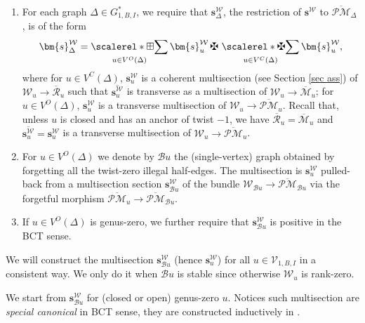 \documentclass[11pt]{amsart}
\theoremstyle{definition}
\theoremstyle{remark}
\newcommand{\Ass}{{{\,\maltese\,}}}
\newcommand{\oPMb}{{\overline{\mathcal{PM}}}}
\newcommand{\<}{\left<}
\renewcommand{\>}{\right>}
\numberwithin{equation}{section}
\def\Mbar{{\overline{\mathcal M}}}
\DeclareMathOperator*{\bboxplus}{\scalerel*{\boxplus}{\sum}}
\DeclareMathOperator*{\bass}{\scalerel*{\maltese}{\sum}}
\begin{document}
\begin{enumerate}
    \item For each graph $\Delta\in G_{1,B,I}^*$, we require that $\bm{s}^{\mathcal W}_{\Delta}$, the restriction of $\bm{s}^{\mathcal W}$ to $\oPMb_\Delta$, is of the form
    \begin{equation}\label{eq docomposition of section of witten on central}
        \bm{s}^{\mathcal W}_{\Delta}= \bboxplus_{u\in V^O(\Delta)} \bm{s}_u^{\mathcal W}\Ass\bass_{u\in V^C(\Delta)}\bm{s}_u^{\mathcal W},
    \end{equation}
    where for $u\in V^C(\Delta)$, $\bm{s}_u^{\mathcal W}$ is a coherent multisection (see Section \ref{sec ass}) of $\mathcal W_u\to \overline{\mathcal R}_u$ such that $\overline{\bm{s}_u^{\mathcal W}}$ is transverse as a multisection of $\mathcal W_u\to \Mbar_u$; for $u\in V^O(\Delta)$, $\bm{s}_u^{\mathcal W}$ is a transverse multisection of $\mathcal W_u\to \oPMb_u$. Recall that, unless $u$ is closed and has an anchor of twist $-1$, we have $\overline{\mathcal R}_u=\Mbar_u$ and $\overline{\bm{s}_u^{\mathcal W}}=\bm{s}_u^{\mathcal W}$ is a transverse multisection of $\mathcal W_u\to \oPMb_u$. 
   
  
    \item For $u\in V^O(\Delta)$ we denote by $\mathcal B u$ the (single-vertex) graph obtained by forgetting all the twist-zero illegal half-edges. The multisection is $\bm{s}_u^{\mathcal W}$ pulled-back from a multisection section $\bm{s}_{\mathcal B u}^{\mathcal W}$ of the bundle $\mathcal W_{\mathcal B u}\to \oPMb_{\mathcal B u}$ via the forgetful morphism $\oPMb_{u}\to \oPMb_{\mathcal B u}$.
    \item If $u\in V^O(\Delta)$ is genus-zero, we further require that $\bm{s}_{\mathcal B u}^{\mathcal W}$ is positive in the BCT sense.     
\end{enumerate}



 We will construct the multisection $\bm{s}^{\mathcal W}_{\mathcal B u}$ (hence $\bm{s}^{\mathcal W}_{ u}$) for all $u\in \mathcal V_{1,B,I}$ in a consistent way. We only do it when $\mathcal B u$ is stable since otherwise $\mathcal W_u$ is rank-zero.


We start from $\bm{s}^{\mathcal W}_{\mathcal B u}$ for (closed or open) genus-zero $u$. Notices such multisection are \textit{special canonical} in BCT sense, they are constructed inductively in \cite[\S 6.2]{BCT2}. 
\end{document}

